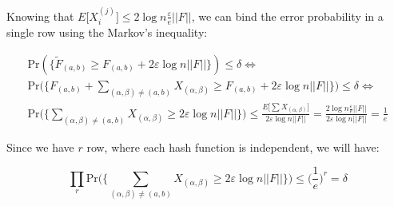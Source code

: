 \documentclass{article}
\begin{document}
\noindent Knowing that $E\big[X_{i}^{(j)}\big] \le 2 \log n \frac{\varepsilon}{e} ||F||$, we can bind the error probability in a single row using the Markov's inequality:

\begin{gather*}
    \textrm{Pr}(\{\tilde{F}_{(a, b)} \ge F_{(a, b)} + 2\varepsilon \log n ||F||\}) \le \delta \iff \\
    \textrm{Pr}\bigg(\bigg\{F_{(a, b)} + \sum_{(\alpha, \beta) \ne (a, b)}X_{(\alpha, \beta)} \ge F_{(a, b)} + 2 \varepsilon \log n ||F|| \bigg\}\bigg) \le \delta \iff \\
    \textrm{Pr}\bigg(\bigg\{\sum_{(\alpha, \beta) \ne (a, b)}X_{(\alpha, \beta)} \ge 2 \varepsilon \log n ||F||\bigg\}\bigg) \le \frac{E\bigg[\sum X_{(\alpha, \beta)}\bigg]}{2 \varepsilon \log n ||F||} = \frac{2 \log n \frac{\varepsilon}{e} ||F||}{2 \varepsilon \log n ||F||} = \frac{1}{e}
\end{gather*}

\noindent Since we have $r$ row, where each hash function is independent, we will have:

\begin{equation*}
    \prod_{r} \textrm{Pr}\bigg(\bigg\{\sum_{(\alpha, \beta) \ne (a, b)}X_{(\alpha, \beta)} \ge 2 \varepsilon \log n ||F||\bigg\}\bigg) \le \bigg(\frac{1}{e}\bigg)^r = \delta
\end{equation*}
\end{document}
